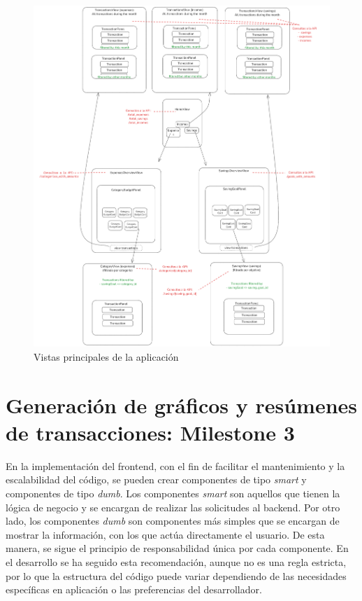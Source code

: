 \begin{figure}[ht!]
    \centering
    \includegraphics[width=\linewidth]{imagenes/componentes-frontend.png}
    \caption{Vistas principales de la aplicación}
    \label{fig:componentes_frontend}
\end{figure}



\section{Generación de gráficos y resúmenes de transacciones: Milestone 3}\label{chap:milestone3}
En la implementación del frontend, con el fin de facilitar el mantenimiento y la escalabilidad del código, se pueden crear componentes de tipo \textit{smart} y componentes de tipo \textit{dumb}. Los componentes \textit{smart} son aquellos que tienen la lógica de negocio y se encargan de realizar las solicitudes al backend. Por otro lado, los componentes \textit{dumb} son componentes más simples que se encargan de mostrar la información, con los que actúa directamente el usuario. De esta manera, se sigue el principio de responsabilidad única por cada componente. En el desarrollo se ha seguido esta recomendación, aunque no es una regla estricta, por lo que la estructura del código puede variar dependiendo de las necesidades específicas en aplicación o las preferencias del desarrollador\cite{khan2023reactjs}.\\

